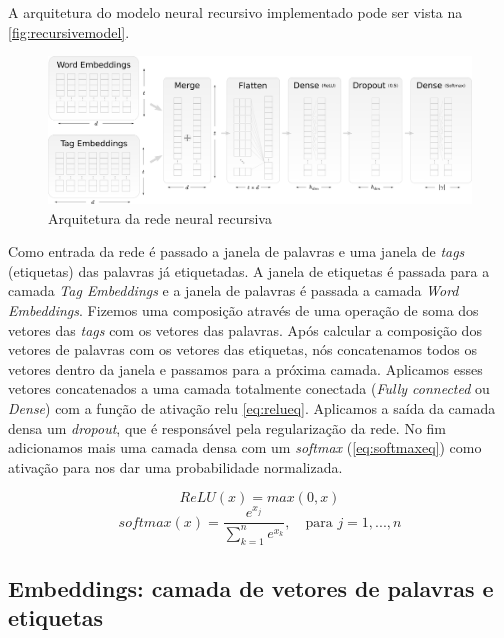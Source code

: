 A arquitetura do modelo neural recursivo implementado pode ser vista na \autoref{fig:recursivemodel}.

\begin{figure}[!htb]
    \caption{Arquitetura da rede neural recursiva}\label{fig:recursivemodel}
    \begin{center}
        \includegraphics[scale=0.19]{img/recursive_model_horizontal.pdf}
    \end{center}
\end{figure}

Como entrada da rede é passado a janela de palavras e uma janela de \textit{tags} (etiquetas) das palavras já etiquetadas. A janela de etiquetas é passada para a camada \textit{Tag Embeddings} e a janela de palavras é passada a camada \textit{Word Embeddings}. Fizemos uma composição através de uma operação de soma dos vetores das \textit{tags} com os vetores das palavras. Após calcular a composição dos vetores de palavras com os vetores das etiquetas, nós concatenamos todos os vetores dentro da janela e passamos para a próxima camada. Aplicamos esses vetores concatenados a uma camada totalmente conectada (\textit{Fully connected} ou \textit{Dense}) com a função de ativação \ac{relu} \autoref{eq:relueq}. Aplicamos a saída da camada densa um \textit{dropout}, que é responsável pela regularização da rede. No fim adicionamos mais uma camada densa com um \textit{softmax} (\autoref{eq:softmaxeq}) como ativação para nos dar uma probabilidade normalizada.

\begin{equation}\label{eq:relueq}
ReLU(x) = max(0, x)
\end{equation}
\begin{equation}\label{eq:softmaxeq}
softmax(x) = \frac{e^{x_j}}{\sum_{k=1}^{n} e^{x_k}}, \quad \mbox{para } j = 1, ..., n
\end{equation}


\subsection{Embeddings: camada de vetores de palavras e etiquetas}

